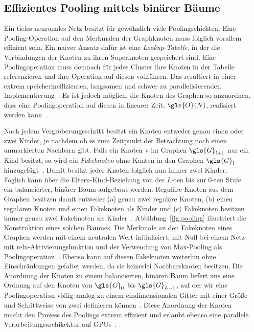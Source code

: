 \subsection{Effizientes Pooling mittels binärer Bäume}
\label{pooling_mit_baeumen}

Ein tiefes neuronales Netz besitzt für gewöhnlich viele Poolingschichten.
Eine Poo\-ling-Operation auf den Merkmalen der Graphknoten muss folglich vorallem effizient sein.
Ein naiver Ansatz dafür ist eine \emph{Lookup-Tabelle}, in der die Verbindungen der Knoten zu ihren Superknoten gespeichert sind.
Eine Poolingoperation muss demnach für jedes Cluster ihre Knoten in der Tabelle referenzieren und ihre Operation auf diesen vollführen.
Das resultiert in einer extrem speicherineffizienten, langsamen und schwer zu parallelisierenden Implementierung~\cite{Defferrard}.
Es ist jedoch möglich, die Knoten des Graphen so anzuordnen, dass eine Poolingoperation auf diesen in linearer Zeit, \dhe{} $\gls{O}\left(N\right)$, realisiert werden kann~\cite{Defferrard}.



Nach jedem Vergröberungsschritt besitzt ein Knoten entweder genau einen oder zwei Kinder, je nachdem ob es zum Zeitpunkt der Betrachtung noch einen unmarkierten Nachbarn gibt.
Falls ein Knoten \gls{v} im Graphen $\gls{G}_{l+1}$ nur ein Kind besitzt, so wird ein \emph{Fakeknoten} ohne Kanten in den Graphen $\gls{G}_l$ hinzugefügt~\cite{Defferrard}.
Damit besitzt jeder Knoten folglich nun immer zwei Kinder.
Foglich kann über die Eltern-Kind-Beziehung von der $L$-ten bis zur $0$-ten Stufe ein balancierter, binärer Baum aufgebaut werden.
Reguläre Knoten aus dem Graphen besitzen damit entweder (a) genau zwei reguläre Knoten, (b) einen regulären Knoten und einen Fakeknoten als Kinder und (c) Fakeknoten besitzen immer genau zwei Fakeknoten als Kinder~\cite{Defferrard}.
Abbildung~\ref{fig:pooling} illustriert die Konstruktion eines solchen Baumes.
Die Merkmale an den Fakeknoten eines Graphen werden mit einem neutralen Wert initialisiert, \dhe{} \zB{} mit Null bei einem Netz mit \gls{relu}-Aktivierungsfunktion und der Verwendung von Max-Pooling als Poolingoperation~\cite{Defferrard}.
Ebenso kann auf diesen Fakeknoten weiterhin ohne Einschränkungen gefaltet werden, da sie keinerlei Nachbarsknoten besitzen.
Die Anordnung der Knoten zu einem balancierten, binären Baum liefert uns eine Ordnung auf den Knoten von $\gls{G}_0$ bis $\gls{G}_{L-1}$, auf der wir eine Poolingoperation völlig analog zu einem eindimensionalen Gitter mit einer Größe und Schrittweise von zwei definieren können~\cite{Defferrard}.
Diese Anordnung der Knoten macht den Prozess des Poolings extrem effizient und erlaubt ebenso eine parallele Verarbeitungsarchikektur auf GPUs~\cite{Defferrard}.

